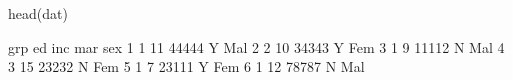 \begin{Schunk}
\begin{Sinput}
  head(dat)
\end{Sinput}
\begin{Soutput}
  grp ed   inc mar sex
1   1 11 44444   Y Mal
2   2 10 34343   Y Fem
3   1  9 11112   N Mal
4   3 15 23232   N Fem
5   1  7 23111   Y Fem
6   1 12 78787   N Mal
\end{Soutput}
\end{Schunk}
